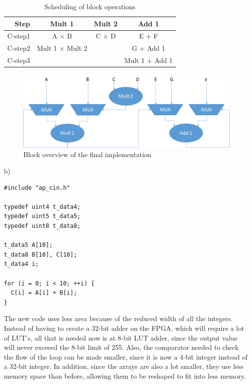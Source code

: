 \documentclass[11pt]{article}
\begin{document}
\begin{table}[h!]
  \centering
  \begin{tabular}{| r | c c c |}
    \hline
    Step & Mult 1 & Mult 2 & Add 1 \\
    \hline
    C-step1 & A $\times$ B & C $\times$ D & E + F \\
    C-step2 & Mult 1 $\times$ Mult 2 & & G + Add 1 \\
    C-step3 & & & Mult 1 + Add 1 \\
    \hline
  \end{tabular}
  \caption{Scheduling of block operations}
  \label{tab:q3_schedule}
\end{table}

\begin{figure}[h!]
  \centering
  \includegraphics[width=\linewidth]{q3/q3_diagram.png}
  \caption{Block overview of the final implementation}
  \label{fig:q3_hw}
\end{figure}

\clearpage

b)
\begin{lstlisting}[showstringspaces=false]
#include "ap_cin.h"

typedef uint4 t_data4;
typedef uint5 t_data5;
typedef uint8 t_data8;

t_data5 A[10];
t_data8 B[10], C[10];
t_data4 i;

for (i = 0; i < 10; ++i) {
  C[i] = A[i] + B[i];
}
\end{lstlisting}

The new code uses less area because of the reduced width of all the integers. Instead of having to create a 32-bit adder on the FPGA, which will require a lot of LUT's, all that is needed now is at 8-bit LUT adder, since the output value will never exceeed the 8-bit limit of 255. Also, the comparator needed to check the flow of the loop can be made smaller, since it is now a 4-bit integer instead of a 32-bit integer. In addition, since the arrays are also a lot smaller, they use less memory space than before, allowing them to be reshaped to fit into less memory.
\end{document}
